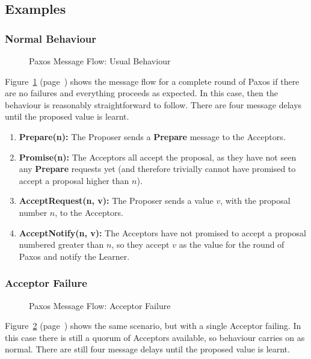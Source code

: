 \documentclass[12pt,twoside,notitlepage]{report}
\newcommand{\lwincludegraphics}[2][]{%
  \sbox{0}{\texttt{[image: \#2]}}%
  \ifdim\wd0>\linewidth
    \resizebox{\linewidth}{!}{\box0 }%
  \else
    \leavevmode\box0
  \fi}
\newcommand{\msg}[1] {{\bf #1}}         %
\begin{document}
\subsection*{Examples}

\subsubsection*{Normal Behaviour}

\begin{figure}[h!]
\centering
\lwincludegraphics{figs/paxos-msg-flow-usual.eps}
\caption{\label{fig:paxos-usual}Paxos Message Flow: Usual Behaviour}
\end{figure}

Figure~\ref{fig:paxos-usual} (page~\pageref{fig:paxos-usual}) shows the message flow for a
complete round of Paxos if there are no failures and everything proceeds as expected. In this
case, then the behaviour is reasonably straightforward to follow. There are four message delays
until the proposed value is learnt.

\begin{enumerate}
\item \msg{Prepare(n):} The Proposer sends a \msg{Prepare} message to the Acceptors.
\item \msg{Promise(n):} The Acceptors all accept the proposal, as they have not seen any
	\msg{Prepare} requests yet (and therefore trivially cannot have promised to accept a
	proposal higher than $n$).
\item \msg{AcceptRequest(n, v):} The Proposer sends a value $v$, with the proposal number $n$, to
the Acceptors.
\item \msg{AcceptNotify(n, v):} The Acceptors have not promised to accept a proposal numbered
	greater than $n$, so they accept $v$ as the value for the round of Paxos and notify the
	Learner.
\end{enumerate}

\subsubsection*{Acceptor Failure}

\begin{figure}[h!]
\centering
\lwincludegraphics{figs/paxos-msg-flow-one-acceptor-fail.eps}
\caption{\label{fig:paxos-acceptor-fail}Paxos Message Flow: Acceptor Failure}
\end{figure}

Figure~\ref{fig:paxos-acceptor-fail} (page~\pageref{fig:paxos-acceptor-fail}) shows the same
scenario, but with a single Acceptor failing. In this case there is still a quorum of Acceptors
available, so behaviour carries on as normal. There are still four message delays until the
proposed value is learnt.
\end{document}
